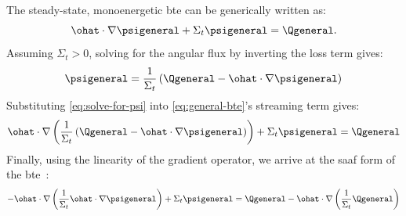 The steady-state, monoenergetic \gls{bte} can be generically written as:
\begin{equation}
  \label{eq:general-bte}
  \ohat\cdot\nabla\psigeneral+\Sigma_t\psigeneral=\Qgeneral.
\end{equation}
Assuming $\Sigma_t>0$, solving for the angular flux by inverting the loss term gives:
\begin{equation}
  \label{eq:solve-for-psi}
  \psigeneral=\frac{1}{\Sigma_t}\left(\Qgeneral-\ohat\cdot\nabla\psigeneral\right)
\end{equation}
Substituting \cref{eq:solve-for-psi} into \cref{eq:general-bte}'s streaming term gives:
\begin{equation}
  \label{eq:saaf-partial}
  \ohat\cdot\nabla\left(\frac{1}{\Sigma_t}\left(\Qgeneral-\ohat\cdot\nabla\psigeneral\right)\right)+\Sigma_t\psigeneral=\Qgeneral
\end{equation}
Finally, using the linearity of the gradient operator, we arrive at the \gls{saaf} form of the \gls{bte}~\cite{liscum-powellFiniteElementSolution2002}:
\begin{equation}
  \label{eq:saaf-general}
  -\ohat\cdot\nabla\left(\frac{1}{\Sigma_t}\ohat\cdot\nabla\psigeneral\right)+\Sigma_t\psigeneral=\Qgeneral-\ohat\cdot\nabla\left(\frac{1}{\Sigma_t}\Qgeneral\right)
\end{equation}